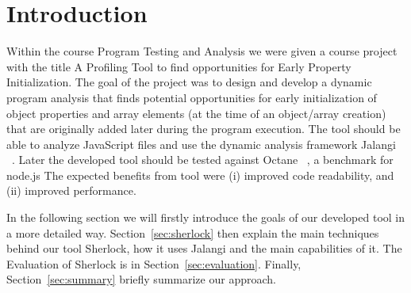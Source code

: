 \section{Introduction}
Within the course Program Testing and Analysis we were given a course project with the title
 \glqq{}A Profiling Tool to find opportunities for Early Property Initialization\grqq{}. 
 The goal of the project was to design and develop a dynamic program analysis that finds potential  
 opportunities for early initialization of object properties and array elements 
 (at the time of an object/array creation) that are originally added later during the program execution.
 The tool should be able to analyze JavaScript files and use the dynamic analysis framework Jalangi ~\cite{jalangi}.
 Later the developed tool should be tested against Octane ~\cite{octance}, a benchmark for node.js The expected 
 benefits from tool were (i) improved code readability, and (ii) improved performance.

 In the following section
 we will firstly introduce the goals of our developed tool in a more detailed way. Section~\ref{sec:sherlock} 
 then explain the main techniques behind our tool Sherlock, how it uses Jalangi and the main capabilities of it.
 The Evaluation of Sherlock is in Section~\ref{sec:evaluation}. Finally, Section~\ref{sec:summary} briefly summarize
 our approach.